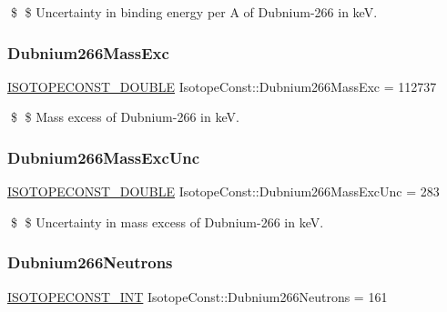 \$ \$ Uncertainty in binding energy per A of Dubnium-\/266 in keV. \mbox{\label{group___isotope_const-_dubnium-_db266_ga5d3f5ec3ffcd15b01961158e7eb5aebb}} 
\subsubsection{\texorpdfstring{Dubnium266\+Mass\+Exc}{Dubnium266MassExc}}
{\footnotesize\ttfamily \mbox{\hyperlink{group___isotope_const-_macros_ga8f45a7272ce02c0b4c65c44636ed719a}{I\+S\+O\+T\+O\+P\+E\+C\+O\+N\+S\+T\+\_\+\+D\+O\+U\+B\+LE}} Isotope\+Const\+::\+Dubnium266\+Mass\+Exc = 112737}

\$ \$ Mass excess of Dubnium-\/266 in keV. \mbox{\label{group___isotope_const-_dubnium-_db266_ga396115fa6388d4d60619eea7325cee1a}} 
\subsubsection{\texorpdfstring{Dubnium266\+Mass\+Exc\+Unc}{Dubnium266MassExcUnc}}
{\footnotesize\ttfamily \mbox{\hyperlink{group___isotope_const-_macros_ga8f45a7272ce02c0b4c65c44636ed719a}{I\+S\+O\+T\+O\+P\+E\+C\+O\+N\+S\+T\+\_\+\+D\+O\+U\+B\+LE}} Isotope\+Const\+::\+Dubnium266\+Mass\+Exc\+Unc = 283}

\$ \$ Uncertainty in mass excess of Dubnium-\/266 in keV. \mbox{\label{group___isotope_const-_dubnium-_db266_gaebecc84a691e353022edd678c8aba2f1}} 
\subsubsection{\texorpdfstring{Dubnium266\+Neutrons}{Dubnium266Neutrons}}
{\footnotesize\ttfamily \mbox{\hyperlink{group___isotope_const-_macros_ga5f18360b3e99483a35c32d789e62621c}{I\+S\+O\+T\+O\+P\+E\+C\+O\+N\+S\+T\+\_\+\+I\+NT}} Isotope\+Const\+::\+Dubnium266\+Neutrons = 161}

